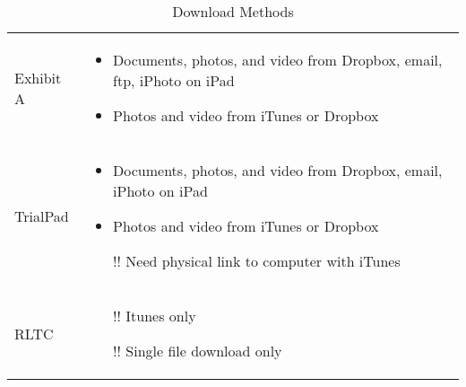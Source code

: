 \begin{center}

\begin{table}[htbp]
\label{tab:DownloadMethod}
  \centering
  \caption{Download Methods}
    \begin{tabular}{|p{}|p{}|}
    \hline    
    \rowcolor{lightgrey}\multicolumn{2}{|c|}{Download Methods}\\
    \hline
    Exhibit A & 
    \begin{itemize}
      \item Documents, photos, and video from Dropbox, email, ftp, iPhoto on iPad 
      \item Photos and video from iTunes or Dropbox
    \end{itemize} \\
    \hline
    TrialPad & 
    \begin{itemize}
      \item Documents, photos, and video from Dropbox, email, iPhoto on iPad
      \item Photos and video from iTunes or Dropbox
      \item [\color{amber}!!]\color{black}Need physical link to computer with iTunes
    \end{itemize} \\
    \hline


    RLTC  & 
    \begin{itemize}
      \item [\color{amber}!!]\color{black}Itunes only
      \item [\color{amber}!!]\color{black}Single file download only
    \end{itemize} \\
    \hline
    \end{tabular}%
  
\end{table}%
\end{center}


